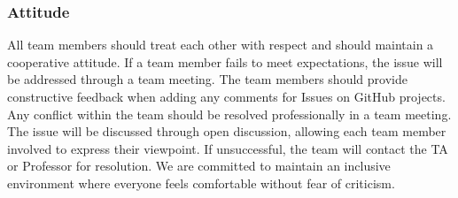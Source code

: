 \documentclass{article}
\begin{document}
\subsubsection*{Attitude}
All team members should treat each other with respect and should maintain a cooperative attitude. If a team member fails to meet expectations, the issue will be addressed through a team meeting. The team members should provide constructive feedback when adding any comments for Issues on GitHub projects. Any conflict within the team should be resolved professionally in a team meeting. The issue will be discussed through open discussion, allowing each team member involved to express their viewpoint. If unsuccessful, the team will contact the TA or Professor for resolution. We are committed to maintain an inclusive environment where everyone feels comfortable without fear of criticism.
\end{document}
